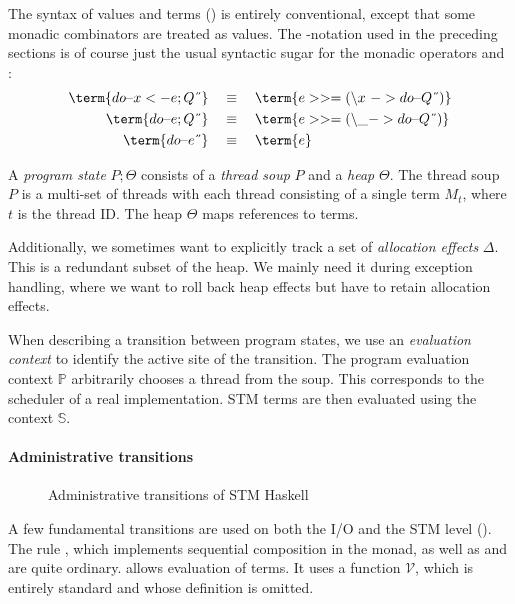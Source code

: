 The syntax of values and terms () is entirely conventional, except that some monadic combinators are treated as values.
%
The -notation used in the preceding sections is of course just the usual syntactic sugar for the monadic operators \term{>>=} and :
\begin{align*}
\term{do \string{ x <- e; Q \string}} & \quad\equiv\quad \term{e >>= (\string\x \ -> do \string{ Q \string})}\\
\term{do \string{ e; Q \string}} & \quad\equiv\quad \term{e >>= (\string\_ -> do \string{ Q \string})}\\
\term{do \string{ e \string}} & \quad\equiv\quad \term{e}
\end{align*}

A \emph{program state} $P;\Theta$ consists of a \emph{thread soup} $P$ and a \emph{heap} $\Theta$.
The thread soup $P$ is a multi-set of threads with each thread consisting of a single term $M_t$, where $t$ is the thread ID.
The heap $\Theta$ maps references to terms.

Additionally, we sometimes want to explicitly track a set of \emph{allocation effects} $\Delta$.
This is a redundant subset of the heap.
We mainly need it during exception handling, where we want to roll back heap effects but have to retain allocation effects.

When describing a transition between program states, we use an \emph{evaluation context} to identify the active site of the transition.
The program evaluation context $\mathbb{P}$ arbitrarily chooses a thread from the soup.
This corresponds to the scheduler of a real implementation.
STM terms are then evaluated using the context $\mathbb{S}$.

\paragraph{Administrative transitions}

\begin{figure}

\caption{Administrative transitions of STM Haskell \parencite{harris-et-al-2005}}
\label{fig:orig-admin}
\end{figure}

A few fundamental transitions are used on both the I/O and the STM level ().
The rule , which implements sequential composition in the monad, as well as  and  are quite ordinary.
 allows evaluation of terms.
It uses a function $\mathcal{V}$, which is entirely standard and whose definition is omitted.

